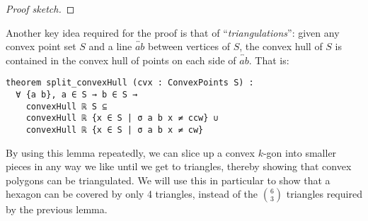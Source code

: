 \begin{proof}[Proof sketch]
\end{proof}

Another key idea required for the proof is that of ``\emph{triangulations}'': given any convex point set $S$ and a line $\overleftrightarrow{ab}$ between vertices of $S$, the convex hull of $S$ is contained in the convex hull of points on each side of $\overleftrightarrow{ab}$. That is:
\begin{lstlisting}
theorem split_convexHull (cvx : ConvexPoints S) :
  ∀ {a b}, a ∈ S → b ∈ S →
    convexHull ℝ S ⊆
    convexHull ℝ {x ∈ S | σ a b x ≠ ccw} ∪
    convexHull ℝ {x ∈ S | σ a b x ≠ cw}
\end{lstlisting}
By using this lemma repeatedly, we can slice up a convex $k$-gon into smaller pieces in any way we like until we get to triangles, thereby showing that convex polygons can be triangulated. We will use this in particular to show that a hexagon can be covered by only 4 triangles, instead of the ${6\choose 3}$ triangles required by the previous lemma.


